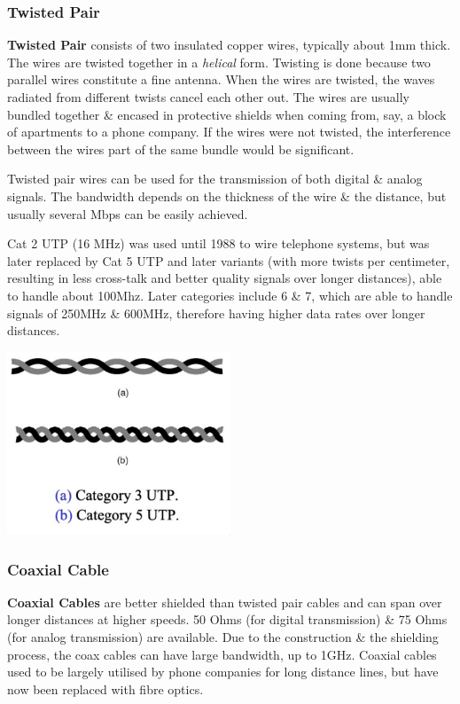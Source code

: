 \documentclass[11pt]{article}
\begin{document}
\subsubsection{Twisted Pair} 
\textbf{Twisted Pair} consists of two insulated copper wires, typically about 1mm thick. 
The wires are twisted together in a \textit{helical} form. 
Twisting is done because two parallel wires constitute a fine antenna. 
When the wires are twisted, the waves radiated from different twists cancel each other out. 
The wires are usually bundled together \& encased in protective shields when coming from, say, a block of apartments to a phone 
company. 
If the wires were not twisted, the interference between the wires part of the same bundle would be significant.

Twisted pair wires can be used for the transmission of both digital \& analog signals. 
The bandwidth depends on the thickness of the wire \& the distance, but usually several Mbps can be easily achieved. 

Cat 2 UTP (16 MHz) was used until 1988 to wire telephone systems, but was later replaced by Cat 5 UTP and later variants 
(with more twists per centimeter, resulting in less cross-talk and better quality signals over longer distances), able to handle about 
100Mhz. 
Later categories include 6 \& 7, which are able to handle signals of 250MHz \& 600MHz, therefore having higher data rates 
over longer distances. 

\begin{center}
    \includegraphics[width=0.5\textwidth]{twistedpair.png}
\end{center}

\subsubsection{Coaxial Cable}
\textbf{Coaxial Cables} are better shielded than twisted pair cables and can span over longer distances at higher speeds. 
50 Ohms (for digital transmission) \& 75 Ohms (for analog transmission) are available. 
Due to the construction \& the shielding process, the coax cables can have large bandwidth, up to 1GHz. 
Coaxial cables used to be largely utilised by phone companies for long distance lines, but have now been replaced with 
fibre optics. 
\end{document}
